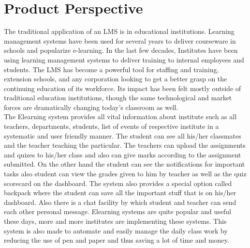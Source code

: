 \section{Product Perspective}
The traditional application of an LMS is in educational institutions. Learning management systems have been used for several years to deliver courseware in schools and popularize e-learning. In the last few decades, Institutes have been using learning management systems to deliver training to internal employees and students. The LMS has become a powerful tool for staffing and training, extension schools, and any corporation looking to get a better grasp on the continuing education of its workforce. Its impact has been felt mostly outside of traditional education institutions, though the same technological and market forces are dramatically changing today’s classroom as well. \\

\noindent The Elearning system provides all vital information about institute such as all teachers, departments, students, list of events of respective institute in a systematic and user friendly manner. The student can see all his/her classmates and the teacher teaching the particular. The teachers can upload the assignments and quizes to his/her class and also can give marks according to the assignment submitted. On the other hand the student can see the notifications for important tasks also student can view the grades given to him by teacher as well as the quiz scorecard on the dashboard. The system also provides a special option called backpack where the student can save all the important stuff that is on his/her dashboard. Also there is a chat facility by which student and teacher can send each other personal message. Elearning systems are quite popular and useful these days, more and more institutes are implementing these systems. This system is also made to automate and easily manage the daily class work by reducing the use of pen and paper and thus saving a lot of time and money.



